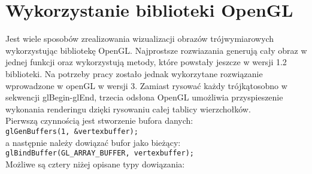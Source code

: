 \section{Wykorzystanie biblioteki OpenGL}
Jest wiele sposobów zrealizowania wizualizacji obrazów trójwymiarowych wykorzystując bibliotekę OpenGL. Najprostsze rozwiazania generują cały obraz w jednej funkcji oraz wykorzystują metody, które powstały jeszcze w wersji 1.2 biblioteki. Na potrzeby pracy zostało jednak wykorzytane rozwiązanie wprowadzone w openGL w wersji 3. Zamiast rysować każdy trójkątosobno w sekwencji glBegin-glEnd, trzecia odsłona OpenGL umożliwia przyspieszenie wykonania renderingu dzięki rysowaniu całej tablicy wierzchołków.\\
Pierwszą czynnością jest stworzenie bufora danych:\\
\verb$glGenBuffers(1, &vertexbuffer);$\\
a następnie należy dowiązać bufor jako bieżący:\\
\verb$glBindBuffer(GL_ARRAY_BUFFER, vertexbuffer);$\\
Możliwe są cztery niżej opisane typy dowiązania: \\

